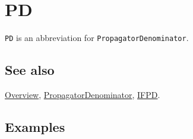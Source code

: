 \documentclass[../FeynCalcManual.tex]{subfiles}
\begin{document}
\hypertarget{pd}{%
\section{PD}\label{pd}}

\texttt{PD} is an abbreviation for \texttt{PropagatorDenominator}.

\subsection{See also}

\hyperlink{toc}{Overview},
\hyperlink{propagatordenominator}{PropagatorDenominator},
\hyperlink{ifpd}{IFPD}.

\subsection{Examples}
\end{document}
